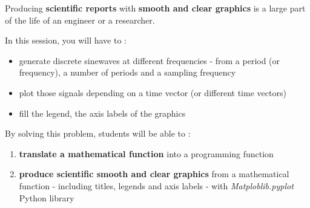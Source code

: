 \documentclass[10pt]{article} %
\begin{document}
\begin{minipage}[t]{.60\linewidth} %

\hypertarget{context}{\heading{\huge \problemName}{6pt}} %


Producing \textbf{scientific reports} with \textbf{smooth and clear graphics} is a large part of the life of an engineer or a researcher.

In this session, you will have to : 
\begin{itemize}
	\item generate discrete sinewaves at different frequencies - from a period (or frequency), a number of periods and a sampling frequency 
	\item plot those signals depending on a time vector (or different time vectors)
	\item fill the legend, the axis labels of the graphics	
\end{itemize}


\bigskip


\begin{mdframed}[style=intextbox,frametitle={}] %


\hypertarget{ilos}{} %

By solving this problem, students will be able to :
\begin{enumerate}
\item \textbf{translate a mathematical function} into a programming function
\item \textbf{produce scientific smooth and clear graphics} from a mathematical function - including titles, legends and axis labels - with \textit{Matploblib.pyplot} Python library
\end{enumerate}

\end{mdframed}
\medskip



\end{minipage}
\end{document}
